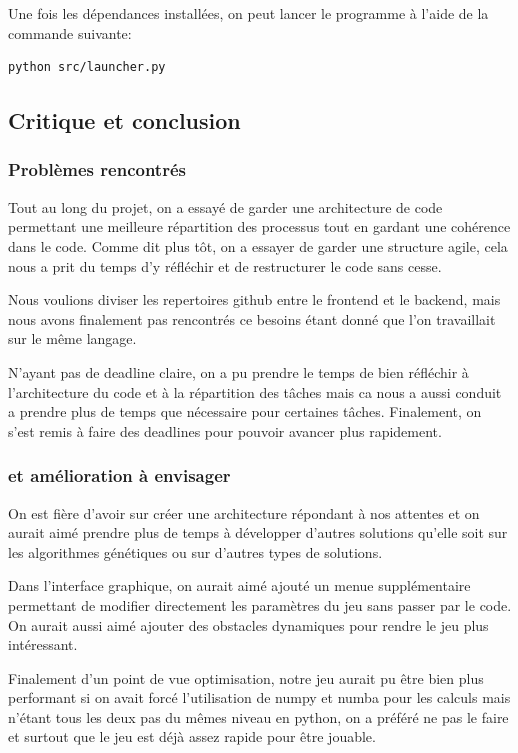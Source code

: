 \documentclass[french,a4paper,10pt,twocolumn]{article}
\begin{document}
Une fois les dépendances installées, on peut lancer le programme à l'aide de la commande suivante:
\begin{lstlisting}[style=bash]
    python src/launcher.py
\end{lstlisting}

\subsection{Critique et conclusion}
\subsubsection{Problèmes rencontrés}

Tout au long du projet, on a essayé de garder une architecture de code permettant une meilleure répartition des processus
tout en gardant une cohérence dans le code. 
Comme dit plus tôt, on a essayer de garder une structure agile, cela nous a prit du temps d'y réfléchir et de restructurer le code sans cesse.

Nous voulions diviser les repertoires github entre le frontend et le backend, mais nous avons finalement pas rencontrés ce besoins étant donné
que l'on travaillait sur le même langage. 

N'ayant pas de deadline claire, on a pu prendre le temps de bien réfléchir à l'architecture du code et à la répartition des tâches mais 
ca nous a aussi conduit a prendre plus de temps que nécessaire pour certaines tâches.
Finalement, on s'est remis à faire des deadlines pour pouvoir avancer plus rapidement.

\subsubsection{et amélioration à envisager}

On est fière d'avoir sur créer une architecture répondant à nos attentes et on aurait aimé prendre plus de temps à développer d'autres solutions 
qu'elle soit sur les algorithmes génétiques ou sur d'autres types de solutions.

Dans l'interface graphique, on aurait aimé ajouté un menue supplémentaire permettant de modifier directement les paramètres du jeu sans passer par le code.
On aurait aussi aimé ajouter des obstacles dynamiques pour rendre le jeu plus intéressant.

Finalement d'un point de vue optimisation, notre jeu aurait pu être bien plus performant si on avait forcé l'utilisation de numpy et numba pour les calculs 
mais n'étant tous les deux pas du mêmes niveau en python, on a préféré ne pas le faire et surtout que le jeu est déjà assez rapide pour être jouable.

\printbibliography
\end{document}
